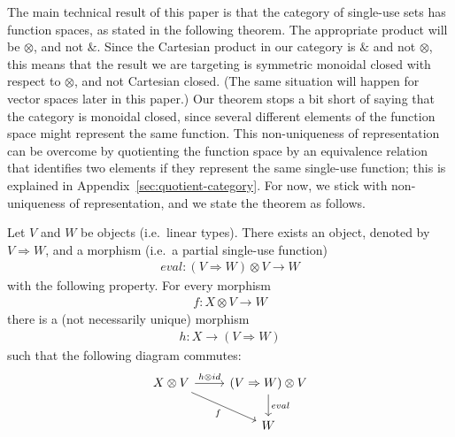 \documentclass[10pt,a4paper]{amsart}
\numberwithin{equation}{section}
\theoremstyle{plain}
\newcommand{\funspace}[2]{#1 \Rightarrow #2}
\begin{document}
 
The main technical result of this paper is that the category of single-use sets has function spaces, as stated in the following theorem.  The appropriate product will be $\otimes$, and not $\&$. Since the Cartesian product in our category is $\&$ and not $\otimes$, this means that the result we are targeting is symmetric monoidal closed with respect to $\otimes$, and not Cartesian closed. (The same situation will happen  for vector spaces later in this paper.)  Our theorem stops a bit short of saying that the category is monoidal closed, since several different elements of the function space might represent the same function. This non-uniqueness of representation can be overcome  by quotienting the function space  by an equivalence relation that identifies two elements if they represent the same single-use function; this is explained in Appendix~\ref{sec:quotient-category}. For now, we stick with non-uniqueness of representation, and we state the theorem as follows.


\begin{theorem}\label{thm:single-use-closed}
    Let $V$ and $W$ be objects (i.e.~linear types). There exists an object, denoted by  $\funspace V W$, and a morphism (i.e.~a partial single-use function)
    \begin{align*}
    eval : (\funspace V W) \otimes V \to  W
    \end{align*}
    with the following property. For every morphism
    \begin{align*}
    f : {X \otimes V} \to  W
    \end{align*}
    there is a (not necessarily unique) morphism
    \begin{align*}
    h :  X \to (\funspace V W)
    \end{align*}
    such that the following diagram commutes:
    \[
    \begin{tikzcd}
    X \otimes V 
    \arrow[r,"h \otimes id"]
    \arrow[dr,"f"']
    &
    (\funspace V W) \otimes V
    \arrow[d,"eval"] \\
    &
    W
    \end{tikzcd}
    \]
\end{theorem}
\end{document}
